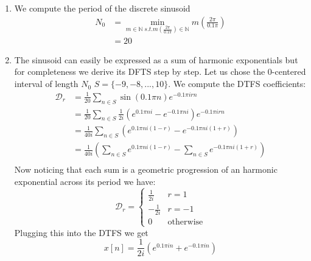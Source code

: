 \begin{enumerate}
  \item We compute the period of the discrete sinusoid
  \begin{equation}
    \begin{aligned}
      N_0 &= \min_{m \in \mathbb{N} \; s.t. m\left(\frac{2\pi}{0.1\pi}\right) \in \mathbb{N}} m\left(\frac{2\pi}{0.1\pi}\right)  \\
      &= 20
    \end{aligned}
  \end{equation}

  \item The sinusoid can easily be expressed as a sum of harmonic exponentials but for completeness we derive its DFTS step by step. Let us chose the 0-centered interval of length $N_0$ $S = \{-9, -8, ..., 10\}$.
  We compute the DTFS coefficients:
  \begin{equation}
    \begin{aligned}
      \mathcal{D}_r &= \frac{1}{20} \sum_{n \in S} \sin\left( 0.1\pi n \right) e^{-0.1 \pi i r n} \\
      &= \frac{1}{20} \sum_{n \in S} \frac{1}{2i} \left( e^{0.1\pi n i} - e^{-0.1\pi n i} \right) e^{-0.1 \pi i r n} \\
      &= \frac{1}{40i} \sum_{n \in S} \left( e^{0.1\pi n i \left(1-r\right)} - e^{-0.1\pi n i \left(1 + r\right)} \right) \\
      &= \frac{1}{40i} \left(\sum_{n \in S} e^{0.1\pi n i \left(1-r\right)} - \sum_{n \in S} e^{-0.1\pi n i \left(1 + r\right)} \right) \\
    \end{aligned}
  \end{equation}
  Now noticing that each sum is a geometric progression of an harmonic exponential across its period we have:
  \begin{equation}
    \mathcal{D}_r = 
    \begin{cases}
      \frac{1}{2i} &  r=1  \\
      -\frac{1}{2i} &   r=-1 \\
      0 & \text{otherwise}
   \end{cases}
  \end{equation}
  Plugging this into the DTFS we get
  \begin{equation}
    x[n] = \frac{1}{2i} \left( e^{0.1 \pi i n} +  e^{-0.1 \pi i n} \right)
  \end{equation}
\end{enumerate}
